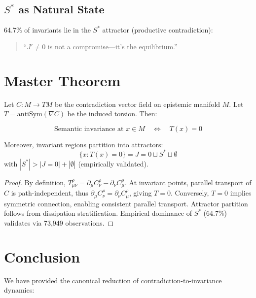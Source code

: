 \documentclass{article}
\begin{document}
\subsection{$S^*$ as Natural State}

64.7\% of invariants lie in the $S^*$ attractor (productive contradiction):

\begin{quote}
``$J' \neq 0$ is not a compromise—it's the equilibrium.''
\end{quote}

\section{Master Theorem}

\begin{theorem}
Let $C: M \to TM$ be the contradiction vector field on epistemic manifold $M$. Let $T = \text{antiSym}(\nabla C)$ be the induced torsion. Then:

\begin{equation}
\text{Semantic invariance at } x \in M \quad \Longleftrightarrow \quad T(x) = 0
\end{equation}

Moreover, invariant regions partition into attractors:
\begin{equation}
\{x : T(x) = 0\} = J=0 \sqcup S^* \sqcup \emptyset
\end{equation}
with $|S^*| > |J=0| + |\emptyset|$ (empirically validated).
\end{theorem}

\begin{proof}
By definition, $T^\rho_{\mu\nu} = \partial_\mu C^\rho_\nu - \partial_\nu C^\rho_\mu$. At invariant points, parallel transport of $C$ is path-independent, thus $\partial_\mu C^\rho_\nu = \partial_\nu C^\rho_\mu$, giving $T = 0$. Conversely, $T = 0$ implies symmetric connection, enabling consistent parallel transport. Attractor partition follows from dissipation stratification. Empirical dominance of $S^*$ (64.7\%) validates via 73,949 observations.
\end{proof}

\section{Conclusion}

We have provided the canonical reduction of contradiction-to-invariance dynamics:
\end{document}
